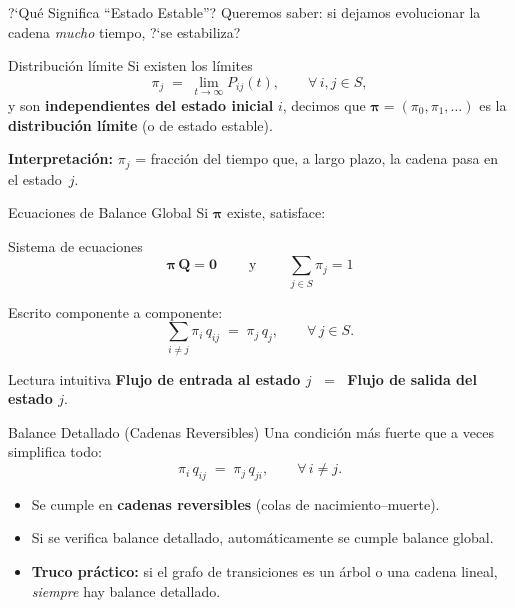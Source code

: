 \documentclass[aspectratio=1610, 10pt]{beamer}
\newcommand{\bpi}{\boldsymbol{\pi}}
\newcommand{\bQ}{\mathbf{Q}}
\begin{document}
\begin{frame}{?`Qu\'{e} Significa ``Estado Estable''?}
  Queremos saber: si dejamos evolucionar la cadena \emph{mucho} tiempo,
  ?`se estabiliza?

  \begin{block}{Distribuci\'{o}n l\'{i}mite}
    Si existen los l\'{i}mites
    \[
      \pi_j \;=\; \lim_{t\to\infty} P_{ij}(t), \qquad \forall\, i,j \in S,
    \]
    y son \textbf{independientes del estado inicial} $i$, decimos que
    $\bpi = (\pi_0, \pi_1, \ldots)$ es la \textbf{distribuci\'{o}n l\'{i}mite}
    (o de estado estable).
  \end{block}

  \vspace{6pt}
  \textbf{Interpretaci\'{o}n:}
  $\pi_j$ = fracci\'{o}n del tiempo que, a largo plazo, la cadena pasa en el estado~$j$.
\end{frame}

\begin{frame}{Ecuaciones de Balance Global}
  Si $\bpi$ existe, satisface:
  \begin{block}{Sistema de ecuaciones}
    \[
      \boxed{\;\bpi\, \bQ = \mathbf{0}\;} \qquad\text{y}\qquad
      \boxed{\;\sum_{j\in S} \pi_j = 1\;}
    \]
  \end{block}

  Escrito componente a componente:
  \[
    \sum_{i \neq j} \pi_i \, q_{ij}
    \;=\; \pi_j \, q_j, \qquad \forall\, j \in S.
  \]

  \begin{exampleblock}{Lectura intuitiva}
    \centering
    \textbf{Flujo de entrada al estado $j$} $\;=\;$
    \textbf{Flujo de salida del estado $j$}.
  \end{exampleblock}
\end{frame}

\begin{frame}{Balance Detallado (Cadenas Reversibles)}
  Una condici\'{o}n m\'{a}s fuerte que a veces simplifica todo:
  \[
    \pi_i \, q_{ij} \;=\; \pi_j \, q_{ji}, \qquad \forall\, i \neq j.
  \]

  \begin{itemize}
    \item Se cumple en \textbf{cadenas reversibles} (colas de nacimiento--muerte).
    \item Si se verifica balance detallado, autom\'{a}ticamente se cumple
          balance global.
    \item \textbf{Truco pr\'{a}ctico:} si el grafo de transiciones es un \'{a}rbol
          o una cadena lineal, \emph{siempre} hay balance detallado.
  \end{itemize}
\end{frame}
\end{document}
